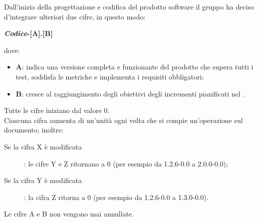 Dall'inizio della progettazione e codifica del prodotto software il gruppo ha deciso d'integrare ulteriori due cifre, in questo  modo:
\begin{center}
\textbf{\textit{Codice}-[A].[B]} 
\end{center}
dove: 
\begin{itemize}
	\item \textbf{A}: indica una versione completa e funzionante del prodotto che supera tutti i test, soddisfa le metriche e implementa i requisiti obbligatori;
	\item \textbf{B}: cresce al raggiungimento degli obiettivi degli incrementi pianificati nel . 
\end{itemize}

Tutte le cifre iniziano dal valore 0. \\ 
Ciascuna cifra aumenta di un'unità ogni volta che si compie un'operazione sul documento; inoltre:
\begin{description}
	\item[Se la cifra X è modificata] : le cifre Y e Z ritornano a 0 (per esempio da 1.2.6-0.0 a 2.0.0-0.0);
	\item[Se la cifra Y è modificata] : la cifra Z ritorna a 0 (per esempio da 1.2.6-0.0 a 1.3.0-0.0).
\end{description}
Le cifre A e B non vengono mai annullate.

